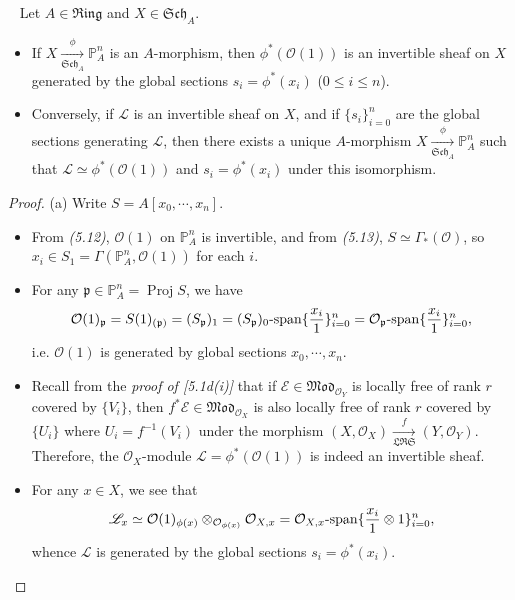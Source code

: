 \documentclass[11pt,a4paper,footinclude=true,headinclude=true]{scrbook} %
\DeclareMathOperator{\Proj}{Proj}
\newcommand{\EE}{\mathscr{E}}
\newcommand{\LL}{\mathscr{L}}
\newcommand{\OO}{\mathcal{O}}
\newcommand{\PP}{\mathbb{P}}
\newcommand{\pp}{\mathfrak{p}}
\newcommand{\LRS}{\mathfrak{LRS}}
\newcommand{\Sch}{\mathfrak{Sch}}
\newcommand{\Ring}{\mathfrak{Ring}}
\newcommand{\<}{\langle}
\newcommand{\>}{\rangle}
\newcommand{\spn}{\mathchar`-\mathrm{span}}
\newcommand{\MOD}{\mathfrak{Mod}}
\newenvironment{theorem}[2][]
{\renewcommand\theinnercustomthm{#2}\innercustomthm[#1]
\begin{mdframed}[backgroundcolor=yellow!20]\ }
{\end{mdframed}\endinnercustomthm}
\begin{document}
\begin{theorem}{7.1}
    Let $A\in\Ring$ and $X\in\Sch_A$.
    \begin{itemize}
        \item[(a)] If $X\xrightarrow[\Sch_A]{\phi}\PP_A^n$ is an $A$-morphism, then $\phi^\ast(\OO(1))$ is an invertible sheaf on $X$ generated by the global sections $s_i=\phi^\ast(x_i)$ ($0\leq i\leq n$).
        \item[(b)] Conversely, if $\LL$ is an invertible sheaf on $X$, and if $\{s_i\}_{i=0}^n$ are the global sections generating $\LL$, then there exists a unique $A$-morphism $X\xrightarrow[\Sch_A]{\phi}\PP_A^n$ such that $\LL\simeq\phi^\ast(\OO(1))$ and $s_i=\phi^\ast(x_i)$ under this isomorphism.
    \end{itemize}
\end{theorem}
\begin{proof}
    (a) Write $S=A[x_0,\cdots,x_n]$.
    \begin{itemize}
        \item From \textit{(5.12)}, $\OO(1)$ on $\PP_A^n$ is invertible, and from \textit{(5.13)}, $S\simeq\Gamma_\ast(\OO)$, so $x_i\in S_1=\Gamma(\PP_A^n,\OO(1))$ for each $i$.
        \item For any $\pp\in\PP_A^n=\Proj S$, we have 
        \begin{align*}
            \OO(1)_\pp=S(1)_{(\pp)}=(S_\pp)_1=(S_\pp)_0\spn\{\frac{x_i}{1}\}_{i=0}^n=\OO_\pp\spn\{\frac{x_i}{1}\}_{i=0}^n,
        \end{align*}
        i.e. $\OO(1)$ is generated by global sections $x_0,\cdots,x_n$.
        \item Recall from the \textit{proof of [5.1d(i)]} that if $\EE\in\MOD_{\OO_Y}$ is locally free of rank $r$ covered by $\{V_i\}$, then $f^\ast\EE\in\MOD_{\OO_X}$ is also locally free of rank $r$ covered by $\{U_i\}$ where $U_i=f^{-1}(V_i)$ under the morphism $(X,\OO_X)\xrightarrow[\LRS]{f}(Y,\OO_Y)$. Therefore, the $\OO_X$-module $\LL=\phi^\ast(\OO(1))$ is indeed an invertible sheaf.
        \item For any $x\in X$, we see that
        \begin{align*}
            \LL_x\simeq\OO(1)_{\phi(x)}\otimes_{\OO_{\phi(x)}}\OO_{X,x}=\OO_{X,x}\spn\{\frac{x_i}{1}\otimes1\}_{i=0}^n,
        \end{align*}
        whence $\LL$ is generated by the global sections $s_i=\phi^\ast(x_i)$.
    \end{itemize}
    

\end{proof}
\end{document}

